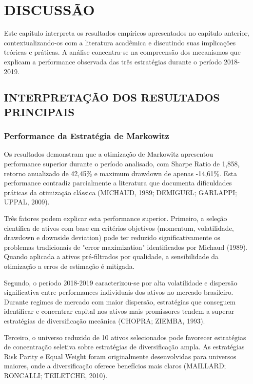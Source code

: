 
\chapter{DISCUSSÃO}

Este capítulo interpreta os resultados empíricos apresentados no capítulo anterior, contextualizando-os com a literatura acadêmica e discutindo suas implicações teóricas e práticas. A análise concentra-se na compreensão dos mecanismos que explicam a performance observada das três estratégias durante o período 2018-2019.

\section{INTERPRETAÇÃO DOS RESULTADOS PRINCIPAIS}

\subsection{Performance da Estratégia de Markowitz}

Os resultados demonstram que a otimização de Markowitz apresentou performance superior durante o período analisado, com Sharpe Ratio de 1,858, retorno anualizado de 42,45\% e maximum drawdown de apenas -14,61\%. Esta performance contradiz parcialmente a literatura que documenta dificuldades práticas da otimização clássica (MICHAUD, 1989; DEMIGUEL; GARLAPPI; UPPAL, 2009).

Três fatores podem explicar esta performance superior. Primeiro, a seleção científica de ativos com base em critérios objetivos (momentum, volatilidade, drawdown e downside deviation) pode ter reduzido significativamente os problemas tradicionais de "error maximization" identificados por Michaud (1989). Quando aplicada a ativos pré-filtrados por qualidade, a sensibilidade da otimização a erros de estimação é mitigada.

Segundo, o período 2018-2019 caracterizou-se por alta volatilidade e dispersão significativa entre performances individuais dos ativos no mercado brasileiro. Durante regimes de mercado com maior dispersão, estratégias que conseguem identificar e concentrar capital nos ativos mais promissores tendem a superar estratégias de diversificação mecânica (CHOPRA; ZIEMBA, 1993).

Terceiro, o universo reduzido de 10 ativos selecionados pode favorecer estratégias de concentração seletiva sobre estratégias de diversificação ampla. As estratégias Risk Parity e Equal Weight foram originalmente desenvolvidas para universos maiores, onde a diversificação oferece benefícios mais claros (MAILLARD; RONCALLI; TEILETCHE, 2010).

